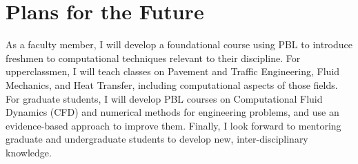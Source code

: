 \documentclass[12pt]{article}
\begin{document}
\section*{Plans for the Future}
As a faculty member, I will develop a foundational course using PBL to introduce freshmen to computational techniques relevant to their discipline. For upperclassmen, I will teach classes on Pavement and Traffic Engineering, Fluid Mechanics, and Heat Transfer, including computational aspects of those fields. For graduate students, I will develop PBL courses on Computational Fluid Dynamics (CFD) and numerical methods for engineering problems, and use an evidence-based approach to improve them. Finally, I look forward to mentoring graduate and undergraduate students to develop new, inter-disciplinary knowledge.

 

\end{document}
